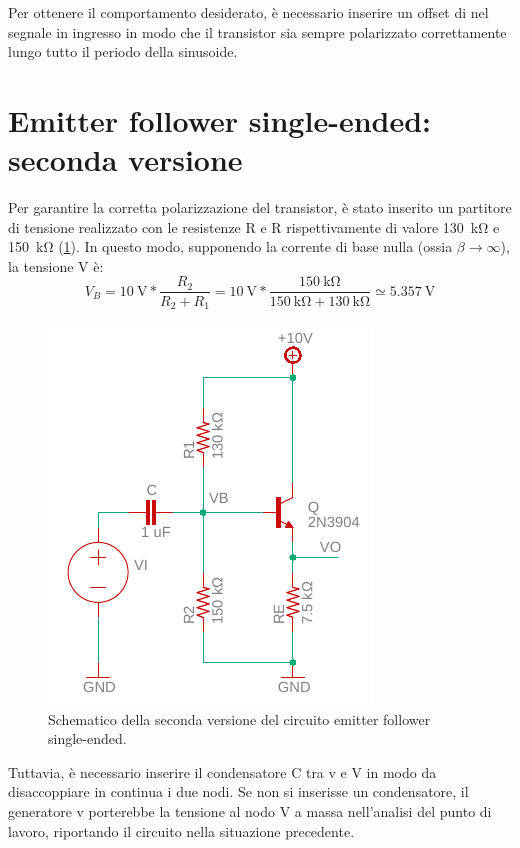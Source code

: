 \noindent
Per ottenere il comportamento desiderato, è necessario inserire un offset di nel segnale in ingresso in modo che il transistor sia sempre polarizzato correttamente lungo tutto il periodo della sinusoide.

\section{Emitter follower single-ended: seconda versione}
Per garantire la corretta polarizzazione del transistor, è stato inserito un partitore di tensione realizzato con le resistenze R e R rispettivamente di valore \SI{130}{\kilo\ohm} e \SI{150}{\kilo\ohm} (\Fig\ref{fig:emitterfollwer_v2}). In questo modo, supponendo la corrente di base nulla (ossia $\beta\to\infty$), la tensione V è:
\begin{equation}
	V_B= \SI{10}{\volt}*\frac{R_2}{R_2+R_1}
	=\SI{10}{\volt}*\frac{\SI{150}{\kilo\ohm}}{\SI{150}{\kilo\ohm}+\SI{130}{\kilo\ohm}}\simeq\SI{5.357}{\volt}
	\label{eq:1}
\end{equation}
\begin{figure}[h!]
	\centering
	\includegraphics[width=0.4\linewidth]{./OtherFiles/Laboratorio 2/emitter follower_v2}
	\caption{Schematico della seconda versione del circuito emitter follower single-ended.}
	\label{fig:emitterfollwer_v2}
\end{figure}

\noindent
Tuttavia, è necessario inserire il condensatore C tra v e V in modo da disaccoppiare in continua i due nodi. Se non si inserisse un condensatore, il generatore v porterebbe la tensione al nodo V a massa nell'analisi del punto di lavoro, riportando il circuito nella situazione precedente.

